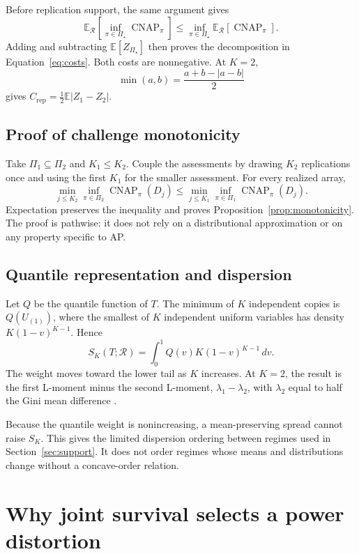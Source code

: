 \documentclass[11pt]{article}
\newcommand{\CNAP}{\operatorname{CNAP}}
\newcommand{\Regime}{\mathcal{R}}
\newcommand{\PSet}{\Pi_\star}
\newcommand{\E}{\mathbb{E}}
\theoremstyle{remark}
\begin{document}
Before replication support, the same argument gives
\[
\E_{\Regime}
\left[
\inf_{\pi\in\PSet}\CNAP_\pi
\right]
\leq
\inf_{\pi\in\PSet}
\E_{\Regime}[\CNAP_\pi].
\]
Adding and subtracting $\E[Z_{\PSet}]$ then proves the decomposition in Equation~\eqref{eq:costs}. Both costs are nonnegative. At $K=2$,
\[
\min(a,b)
=
\frac{a+b-|a-b|}{2}
\]
gives $C_{\mathrm{rep}}=\tfrac12\E|Z_1-Z_2|$.

\subsection{Proof of challenge monotonicity}

Take $\Pi_1\subseteq\Pi_2$ and $K_1\leq K_2$. Couple the assessments by drawing $K_2$ replications once and using the first $K_1$ for the smaller assessment. For every realized array,
\[
\min_{j\leq K_2}\inf_{\pi\in\Pi_2}\CNAP_\pi(D_j)
\leq
\min_{j\leq K_1}\inf_{\pi\in\Pi_1}\CNAP_\pi(D_j).
\]
Expectation preserves the inequality and proves Proposition~\ref{prop:monotonicity}. The proof is pathwise: it does not rely on a distributional approximation or on any property specific to AP.

\subsection{Quantile representation and dispersion}

Let $Q$ be the quantile function of $T$. The minimum of $K$ independent copies is $Q(U_{(1)})$, where the smallest of $K$ independent uniform variables has density $K(1-v)^{K-1}$. Hence
\begin{equation}
S_K(T;\Regime)
=
\int_0^1Q(v)K(1-v)^{K-1}\,dv.
\label{eq:quantile-weight}
\end{equation}
The weight moves toward the lower tail as $K$ increases. At $K=2$, the result is the first L-moment minus the second L-moment, $\lambda_1-\lambda_2$, with $\lambda_2$ equal to half the Gini mean difference \cite{hosking1990lmoments}.

Because the quantile weight is nonincreasing, a mean-preserving spread cannot raise $S_K$. This gives the limited dispersion ordering between regimes used in Section~\ref{sec:support}. It does not order regimes whose means and distributions change without a concave-order relation.

\section{Why joint survival selects a power distortion}
\label{app:characterization}
\end{document}

